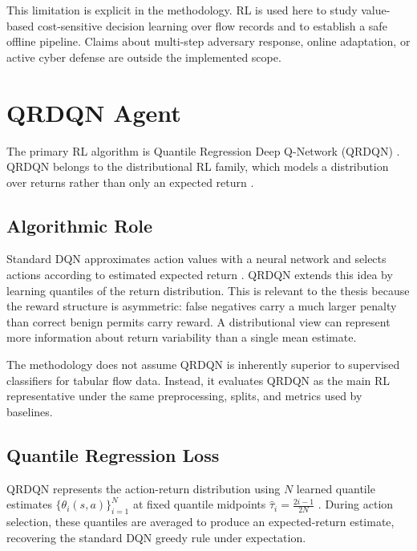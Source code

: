 This limitation is explicit in the methodology. RL is used here to study value-based cost-sensitive decision learning over flow records and to establish a safe offline pipeline. Claims about multi-step adversary response, online adaptation, or active cyber defense are outside the implemented scope.

\section{QRDQN Agent}
The primary RL algorithm is Quantile Regression Deep Q-Network (QRDQN) \parencite{Dabney2018QRDQN}. QRDQN belongs to the distributional RL family, which models a distribution over returns rather than only an expected return \parencite{Bellemare2017DistributionalRL}.

\subsection{Algorithmic Role}
Standard DQN approximates action values with a neural network and selects actions according to estimated expected return \parencite{Mnih2015DQN}. QRDQN extends this idea by learning quantiles of the return distribution. This is relevant to the thesis because the reward structure is asymmetric: false negatives carry a much larger penalty than correct benign permits carry reward. A distributional view can represent more information about return variability than a single mean estimate.

The methodology does not assume QRDQN is inherently superior to supervised classifiers for tabular flow data. Instead, it evaluates QRDQN as the main RL representative under the same preprocessing, splits, and metrics used by baselines.

\subsection{Quantile Regression Loss}
QRDQN represents the action-return distribution using $N$ learned quantile estimates $\{\theta_i(s, a)\}_{i=1}^{N}$ at fixed quantile midpoints $\hat{\tau}_i = \frac{2i-1}{2N}$ \parencite{Dabney2018QRDQN}. During action selection, these quantiles are averaged to produce an expected-return estimate, recovering the standard DQN greedy rule under expectation.

